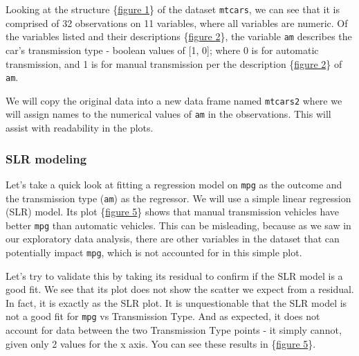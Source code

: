 \documentclass[10pt,]{article}
\begin{document}

Looking at the structure \{\hyperref[fig1]{figure 1}\} of the dataset
\texttt{mtcars}, we can see that it is comprised of 32 observations on
11 variables, where all variables are numeric. Of the variables listed
and their descriptions \{\hyperref[fig2]{figure 2}\}, the variable
\texttt{am} describes the car's transmission type - boolean values of
{[}1, 0{]}; where 0 is for automatic transmission, and 1 is for manual
transmission per the description \{\hyperref[fig2]{figure 2}\} of
\texttt{am}.

We will copy the original data into a new data frame named
\texttt{mtcars2} where we will assign names to the numerical values of
\texttt{am} in the observations. This will assist with readability in
the plots.


\subsubsection{SLR modeling}\label{slr-modeling}

Let's take a quick look at fitting a regression model on \texttt{mpg} as
the outcome and the transmission type (\texttt{am}) as the regressor. We
will use a simple linear regression (SLR) model. Its plot
\{\hyperref[fig5]{figure 5}\} shows that manual transmission vehicles
have better \texttt{mpg} than automatic vehicles. This can be
misleading, because as we saw in our exploratory data analysis, there
are other variables in the dataset that can potentially impact
\texttt{mpg}, which is not accounted for in this simple plot.

Let's try to validate this by taking its residual to confirm if the SLR
model is a good fit. We see that its plot does not show the scatter we
expect from a residual. In fact, it is exactly as the SLR plot. It is
unquestionable that the SLR model is not a good fit for \texttt{mpg} vs
Transmission Type. And as expected, it does not account for data between
the two Transmission Type points - it simply cannot, given only 2 values
for the x axis. You can see these results in \{\hyperref[fig5]{figure
5}\}.
\end{document}
